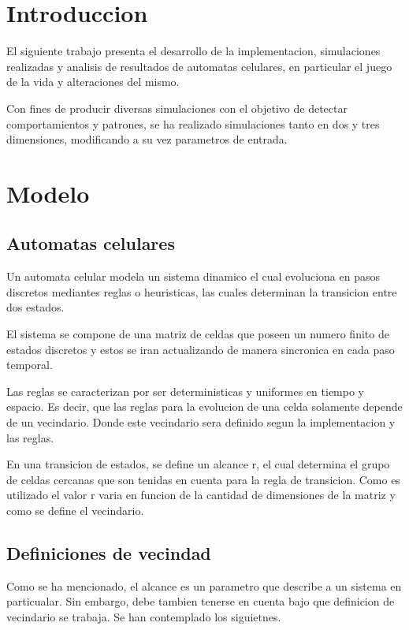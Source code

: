 \documentclass[11pt]{article}
\begin{document}
    \tableofcontents


    \section{Introduccion}
    El siguiente trabajo presenta el desarrollo de la implementacion, simulaciones realizadas y analisis de resultados de
    automatas celulares, en particular el juego de la vida y alteraciones del mismo.

    Con fines de producir diversas simulaciones con el objetivo de detectar comportamientos y patrones, se ha realizado
    simulaciones tanto en dos y tres dimensiones, modificando a su vez parametros de entrada.

    \section{Modelo}

    \subsection{Automatas celulares}

    Un automata celular modela un sistema dinamico el cual evoluciona en pasos discretos mediantes reglas o heuristicas,
     las cuales determinan la transicion entre dos estados.

    El sistema se compone de una matriz de celdas que poseen un numero finito de estados discretos y estos se iran actualizando
    de manera sincronica en cada paso temporal.

    Las reglas se caracterizan por ser deterministicas y uniformes en tiempo y espacio. Es decir, que las reglas para la evolucion
    de una celda solamente depende de un vecindario. Donde este vecindario sera definido segun la implementacion y las reglas.

    En una transicion de estados, se define un alcance r, el cual determina el grupo de celdas cercanas que son tenidas
    en cuenta para la regla de transicion. Como es utilizado el valor r varia en funcion de la cantidad de dimensiones de
    la matriz y como se define el vecindario.

    \subsection{Definiciones de vecindad}
    Como se ha mencionado, el alcance es un parametro que describe a un sistema en particualar. Sin embargo, debe tambien
    tenerse en cuenta bajo que definicion de vecindario se trabaja. Se han contemplado los siguietnes.
\end{document}
